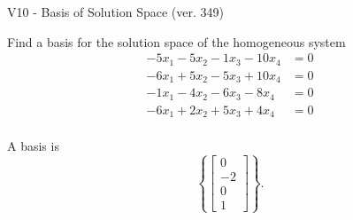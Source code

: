 \begin{exercise}
  \begin{exerciseTitle}V10 - Basis of Solution Space (ver. 349)\end{exerciseTitle}
  \begin{exerciseStatement}
    Find a basis for the solution space of the homogeneous system 
\begin{align*}
 -5 x_ 1 -5 x_ 2 -1 x_ 3 -10 x_ 4 &= 0  \\ 
  -6 x_ 1 + 5 x_ 2 -5 x_ 3 + 10 x_ 4 &= 0  \\ 
  -1 x_ 1 -4 x_ 2 -6 x_ 3 -8 x_ 4 &= 0  \\ 
  -6 x_ 1 + 2 x_ 2 + 5 x_ 3 + 4 x_ 4 &= 0  \\ 
 \end{align*}


 
  \end{exerciseStatement}

  \begin{exerciseAnswer}
   A basis is   
\[\left\{\left[\begin{array}{c}
0 \\
-2 \\
0 \\
1
\end{array}\right]\right\}.\]

  


  \end{exerciseAnswer}
\end{exercise}
